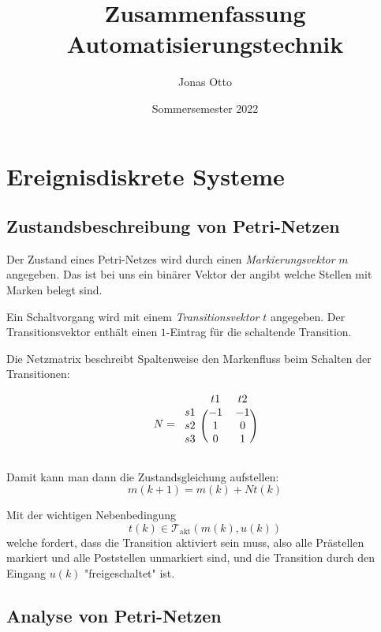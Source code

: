 \documentclass[a4paper]{book}
\title{Zusammenfassung Automatisierungstechnik}
\author{Jonas Otto}
\date{Sommersemester 2022}
\begin{document}
\maketitle
\tableofcontents

\chapter{Ereignisdiskrete Systeme}
\section{Zustandsbeschreibung von Petri-Netzen}

Der Zustand eines Petri-Netzes wird durch einen \emph{Markierungsvektor} $m$ angegeben.
Das ist bei uns ein binärer Vektor der angibt welche Stellen mit Marken belegt sind.

Ein Schaltvorgang wird mit einem \emph{Transitionsvektor} $t$ angegeben.
Der Transitionsvektor enthält einen $1$-Eintrag für die schaltende Transition.

Die Netzmatrix beschreibt Spaltenweise den Markenfluss beim Schalten der Transitionen:

\begin{equation}
    N =
    \begin{blockarray}{ccc}
        & t1 & t2 \\
        \begin{block}{c(cc)}
            s1 & -1 & -1 \\
            s2 &  1 &  0 \\
            s3 &  0 &  1 \\
        \end{block}
    \end{blockarray}
\end{equation}

Damit kann man dann die Zustandsgleichung aufstellen:
\begin{equation}
    m(k+1) = m(k) + N t(k)
\end{equation}

Mit der wichtigen Nebenbedingung
\begin{equation}
    t(k) \in \mathcal{T}_\text{akt}(m(k), u(k))
\end{equation}
welche fordert, dass die Transition aktiviert sein muss, also alle
Prästellen markiert und alle Poststellen unmarkiert sind, und die Transition
durch den Eingang $u(k)$ "freigeschaltet" ist.

\section{Analyse von Petri-Netzen}
\end{document}
